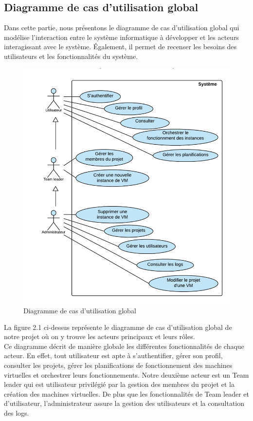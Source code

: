 \subsection {Diagramme de cas d'utilisation global }
Dans cette partie, nous présentons le diagramme de cas d'utilisation global qui modélise
l'interaction entre le système informatique à développer et les acteurs interagissant avec le système.
Également, il permet de recenser  les besoins des utilisateurs et les fonctionnalités du système.
\newpage
\begin{figure}[H]
	\centering
	\includegraphics[scale=0.5]{DCUglobal.png}
	\caption{Diagramme de cas d'utilisation global}
	\label{Diagramme de cas d'utilisation global}
\end{figure}
 La figure 2.1 ci-dessus représente le diagramme de cas d'utilisation global de notre
projet où on y trouve les acteurs principaux et leurs rôles.\\ Ce diagramme décrit de manière globale les différentes fonctionnalités de chaque acteur. 
En effet, tout utilisateur est apte à s'authentifier, gérer son profil, consulter les projets,  gérer les planifications de fonctionnement des machines virtuelles et orchestrer leurs fonctionnements.
Notre deuxième acteur est un Team leader qui est utilisateur privilégié par la gestion des membres du projet et la création des machines virtuelles.
De plus que les fonctionnalités de Team leader et d'utilisateur, l'administrateur assure la gestion des utilisateurs et la consultation des logs.
